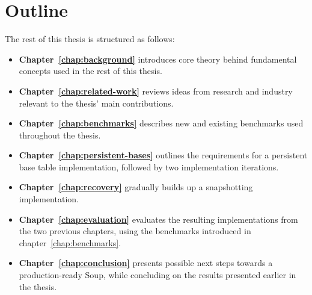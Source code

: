 \section{Outline}

The rest of this thesis is structured as follows:

\begin{itemize}
  \item \textbf{Chapter~\ref{chap:background}} introduces core theory behind fundamental
  concepts used in the rest of this thesis.
  \item \textbf{Chapter~\ref{chap:related-work}} reviews ideas from research and
  industry relevant to the thesis' main contributions.
  \item \textbf{Chapter~\ref{chap:benchmarks}} describes new and existing
  benchmarks used throughout the thesis.
  \item \textbf{Chapter~\ref{chap:persistent-bases}} outlines the requirements
  for a persistent base table implementation, followed by two implementation
  iterations.
  \item \textbf{Chapter~\ref{chap:recovery}} gradually builds up a snapshotting
  implementation.
  \item \textbf{Chapter~\ref{chap:evaluation}} evaluates the resulting
  implementations from the two previous chapters, using the benchmarks
  introduced in chapter~\ref{chap:benchmarks}.
  \item \textbf{Chapter~\ref{chap:conclusion}} presents possible next steps
  towards a production-ready Soup, while concluding on the results presented
  earlier in the thesis.
\end{itemize}
